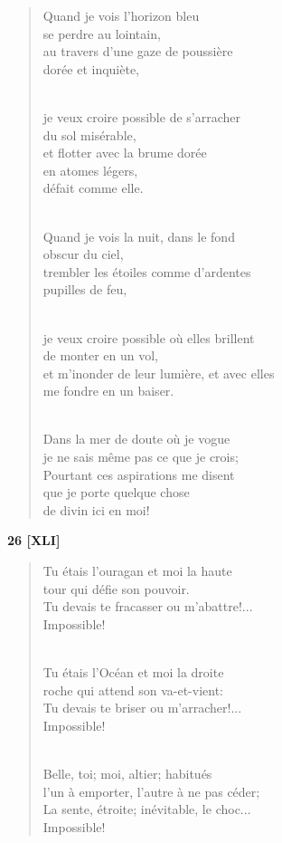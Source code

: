\documentclass[a4paper,11pt]{book}
\begin{document}
\begin{verse}
Quand je vois l'horizon bleu \\
se perdre au lointain, \\
au travers d'une gaze de poussière \\
dorée et inquiète, \\ \

je veux croire possible de s'arracher \\
du sol misérable, \\
et flotter avec la brume dorée \\
en atomes légers, \\
défait comme elle. \\ \

Quand je vois la nuit, dans le fond \\
obscur du ciel, \\
trembler les étoiles comme d'ardentes \\
pupilles de feu, \\ \

je veux croire possible où elles brillent \\
de monter en un vol, \\
et m'inonder de leur lumière, et avec elles \\
me fondre en un baiser. \\ \

Dans la mer de doute où je vogue \\
je ne sais même pas ce que je crois; \\
Pourtant ces aspirations me disent \\
que je porte quelque chose \\
de divin ici en moi! \\
\end{verse}

\bigskip

\begin{center} {\bf 26 [XLI]} \end{center}

\begin{verse}
Tu étais l'ouragan et moi la haute \\
tour qui défie son pouvoir. \\
Tu devais te fracasser ou m'abattre!... \\
Impossible! \\ \

Tu étais l'Océan et moi la droite \\
roche qui attend son va-et-vient: \\
Tu devais te briser ou m'arracher!... \\
Impossible! \\ \

Belle, toi; moi, altier; habitués \\
l'un à emporter, l'autre à ne pas céder; \\
La sente, étroite; inévitable, le choc... \\
Impossible! \\
\end{verse}
\end{document}
